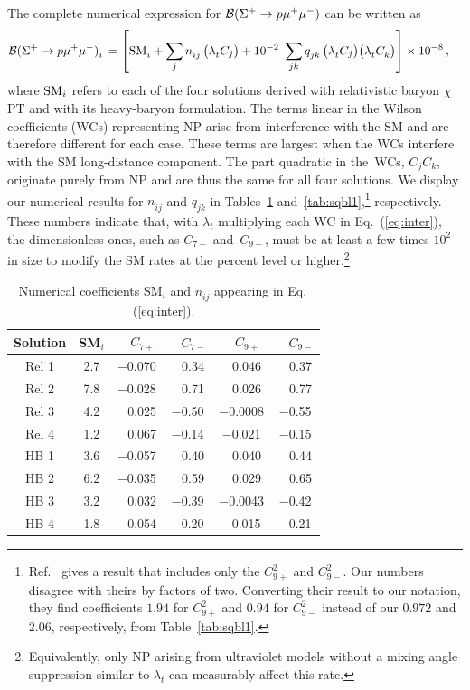 \documentclass[amsmath,amssymb,aps,nofootinbib,prd,preprint,superscriptaddress,tightenlines,a4paper,bm]{revtex4-2}
\begin{document}
The complete numerical expression for ${\cal B}(\Sigma^+\to p\mu^+\mu^-)$ can be written as
\begin{align}
{\cal B}(\Sigma^+\to p\mu^+\mu^-)_i^{} & \,= \left[ {\rm SM}_i^{} + \sum_j n_{ij}^{}\, \big(\lambda_t^{}C_j\big) + 10^{-2}~\sum_{jk} q_{jk}^{}\, \big(\lambda_t^{} C_j\big) \big(\lambda_t^{} C_k^{}\big) \right] \times 10^{-8} \,, &
\label{eq:inter}
\end{align}
where ${\rm SM}_i$ refers to each of the four solutions derived with relativistic baryon $\chi$PT and with its heavy-baryon formulation.
The terms linear in the Wilson coefficients (WCs) representing NP arise from interference with the SM and are therefore different for each case.
These terms are largest when the WCs interfere with the SM long-distance component.
The part quadratic in the~WCs, $C_j C_k$, originate purely from NP and are thus the same for all four solutions.
We display our numerical results for $n_{ij}^{}$ and $q_{jk}^{}$ in Tables~\ref{tab:inter} and~\ref{tab:sqbl1},\footnote{Ref.~\cite{Geng:2021fog} gives a result that includes only the $C_{9+}^2$ and $C_{9-}^2$.
Our numbers disagree with theirs by factors of two.
Converting their result to our notation, they find coefficients $1.94$ for $C_{9+}^2$ and $0.94$ for $C_{9-}^2$ instead of our $0.972$ and $2.06$, respectively, from Table~\ref{tab:sqbl1}.\medskip} respectively.
These numbers indicate that, with $\lambda_t$ multiplying each WC in Eq.~(\ref{eq:inter}), the dimensionless ones, such as $C_{7-}$ and~$C_{9-}$, must be at least a few times $10^2$ in size to modify the SM rates at the percent level or higher.\footnote{Equivalently, only NP arising from ultraviolet models without a mixing angle suppression similar to $\lambda_t$ can measurably affect this rate.\medskip}

\begin{table}[htp] \bigskip
\centering \setlength{\tabcolsep}{1ex}
\begin{tabular}{|c|c|c|c|c|c|}\hline
Solution & SM$_i$ & ~ $C_{7+}$  & ~ $C_{7-}$ & ~ $C_{9+}$ & ~ $C_{9-}$ \\ \hline
Rel 1&2.7& $-$0.070 & ~ 0.34 & ~ 0.046 & ~ 0.37\\
Rel 2&7.8& $-$0.028 & ~ 0.71 & ~ 0.026 & ~ 0.77\\
Rel 3&4.2& ~ 0.025& $-$0.50 & $-0.0008$ & $-$0.55\\
Rel 4&1.2& ~ 0.067& $-$0.14 & $-$0.021 & $-$0.15 \\
 \hline
HB 1&3.6& $-$0.057 & ~ 0.40 & ~ 0.040 & ~ 0.44\\
HB 2&6.2& $-$0.035 & ~ 0.59& ~ 0.029& ~ 0.65\\
HB 3&3.2& ~ 0.032 & $-$0.39& $-$0.0043& $-$0.42\\
HB 4&1.8& ~ 0.054 & $-$0.20& $-$0.015 & $-$0.21\\
\hline
\end{tabular}
\caption{Numerical coefficients SM$_i$ and $n_{ij}^{}$ appearing in Eq.\,(\ref{eq:inter}).}
\label{tab:inter} \medskip
\end{table}
%
\end{document}
